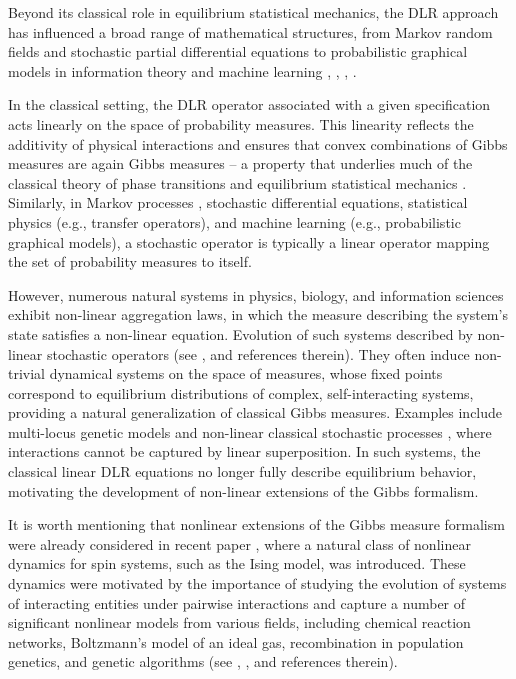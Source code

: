 \documentclass[11pt,reqno]{amsart}
\numberwithin{equation}{section} \setcounter{tocdepth}{1}
\begin{document}
Beyond its classical role in equilibrium statistical mechanics, the DLR approach has influenced a broad range of mathematical structures, 
from Markov random fields and stochastic partial differential equations to probabilistic graphical models in information theory and machine learning \cite{AR}, \cite{Beh}, \cite{HRV}, \cite{Krza}. 

In the classical setting, the DLR operator associated with a given specification acts linearly on the space of probability measures. 
This linearity reflects the additivity of physical interactions and ensures that convex combinations of Gibbs measures are again Gibbs measures -- a property that underlies much of the classical theory of phase transitions and equilibrium statistical mechanics \cite{Do,  Ge, Rue}. Similarly, in Markov processes \cite{SK}, stochastic differential equations, statistical physics (e.g., transfer operators), and machine learning (e.g., probabilistic graphical models), a stochastic operator is typically a linear operator mapping the set of probability measures to itself. 

However, numerous natural systems in physics, biology, and information sciences exhibit non-linear aggregation laws, in which the measure describing the system's state satisfies a non-linear equation. Evolution of such systems described by non-linear stochastic operators (see \cite{Bar,  MG, MSQ, Rab, Rpd, RS}, and references therein). They often induce non-trivial dynamical systems on the space of measures, whose fixed points correspond to equilibrium distributions of complex, self-interacting systems, 
providing a natural generalization of classical Gibbs measures.
Examples include multi-locus genetic models \cite{Ev, Ly, MG, OR, RRS} and non-linear classical stochastic processes \cite{Bo, Fr1, Gr, Reh}, where interactions cannot be captured by linear superposition. 
In such systems, the classical linear DLR equations no longer fully describe equilibrium behavior, motivating the development of non-linear extensions of the Gibbs formalism. 


It is worth mentioning that nonlinear extensions of the Gibbs measure formalism were already considered in recent paper \cite{CP}, where a natural class of nonlinear dynamics for spin systems, such as the Ising model, was introduced. These dynamics were motivated by the importance of studying the evolution of systems of interacting entities under pairwise interactions and capture a number of significant nonlinear models from various fields, including chemical reaction networks, Boltzmann's model of an ideal gas, recombination in population genetics, and genetic algorithms (see \cite{CP2}, \cite{CS}, \cite{CP} and references therein). 
\end{document}
